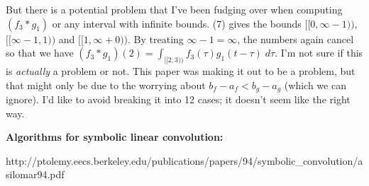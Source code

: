 \documentclass{letter}
\begin{document}
	But there is a potential problem that I've been fudging over when computing $(f_3 * g_1)$ or any interval with 
	infinite bounds.
	(7) gives the bounds $[\![0, \infty-1)\!)$, $[\![\infty-1, 1)\!)$ and $[\![1, \infty+0)\!)$.
	By treating $\infty -1 = \infty$, the numbers again cancel so that we have 
	$(f_3 * g_1)(2) = \int_{[\![2,3)\!)} f_3(\tau)g_1(t-\tau) \; d\tau$.
	I'm not sure if this is \emph{actually} a problem or not. 
	This paper was making it out to be a problem, but that might only be due to the worrying about 
	$b_f - a_f < b_g - a_g$ (which we can ignore).
	I'd like to avoid breaking it into 12 cases; it doesn't seem like the right way.
	
	\textbf{Algorithms for symbolic linear convolution:}

	http://ptolemy.eecs.berkeley.edu/publications/papers/94/symbolic\_convolution/asilomar94.pdf 
\end{document}
